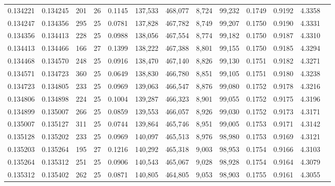 \begin{tabular}{rrrrrrrrrrrrr}
0.134221 & 0.134245 & 201 &  26 &                                     0.1145 & 137,533 & 468,077 &   8,724 &  99,232 & 0.1749 & 0.9192 & 4.3358 \\
0.134247 & 0.134356 & 295 &  25 &                                     0.0781 & 137,828 & 467,782 &   8,749 &  99,207 & 0.1750 & 0.9190 & 4.3331 \\
0.134356 & 0.134413 & 228 &  25 &                                     0.0988 & 138,056 & 467,554 &   8,774 &  99,182 & 0.1750 & 0.9187 & 4.3310 \\
0.134413 & 0.134466 & 166 &  27 &                                     0.1399 & 138,222 & 467,388 &   8,801 &  99,155 & 0.1750 & 0.9185 & 4.3294 \\
0.134468 & 0.134570 & 248 &  25 &                                     0.0916 & 138,470 & 467,140 &   8,826 &  99,130 & 0.1751 & 0.9182 & 4.3271 \\
0.134571 & 0.134723 & 360 &  25 &                                     0.0649 & 138,830 & 466,780 &   8,851 &  99,105 & 0.1751 & 0.9180 & 4.3238 \\
0.134723 & 0.134805 & 233 &  25 &                                     0.0969 & 139,063 & 466,547 &   8,876 &  99,080 & 0.1752 & 0.9178 & 4.3216 \\
0.134806 & 0.134898 & 224 &  25 &                                     0.1004 & 139,287 & 466,323 &   8,901 &  99,055 & 0.1752 & 0.9175 & 4.3196 \\
0.134899 & 0.135007 & 266 &  25 &                                     0.0859 & 139,553 & 466,057 &   8,926 &  99,030 & 0.1752 & 0.9173 & 4.3171 \\
0.135007 & 0.135127 & 311 &  25 &                                     0.0744 & 139,864 & 465,746 &   8,951 &  99,005 & 0.1753 & 0.9171 & 4.3142 \\
0.135128 & 0.135202 & 233 &  25 &                                     0.0969 & 140,097 & 465,513 &   8,976 &  98,980 & 0.1753 & 0.9169 & 4.3121 \\
0.135203 & 0.135264 & 195 &  27 &                                     0.1216 & 140,292 & 465,318 &   9,003 &  98,953 & 0.1754 & 0.9166 & 4.3103 \\
0.135264 & 0.135312 & 251 &  25 &                                     0.0906 & 140,543 & 465,067 &   9,028 &  98,928 & 0.1754 & 0.9164 & 4.3079 \\
0.135312 & 0.135402 & 262 &  25 &                                     0.0871 & 140,805 & 464,805 &   9,053 &  98,903 & 0.1755 & 0.9161 & 4.3055 \\

\end{tabular}
